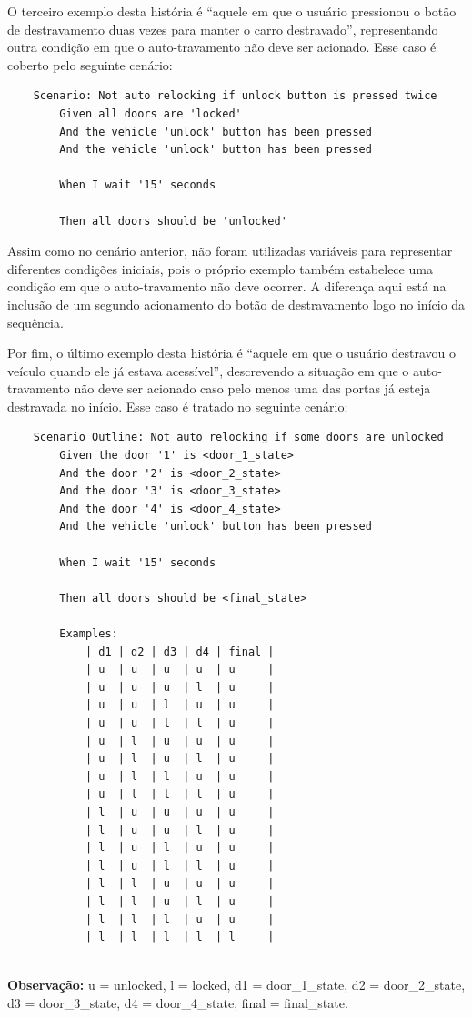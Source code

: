 O terceiro exemplo desta história é ``aquele em que o usuário pressionou o botão de destravamento duas vezes para manter o carro destravado'', representando 
outra condição em que o auto-travamento não deve ser acionado. Esse caso é coberto pelo seguinte cenário:

\begin{verbatim}
    Scenario: Not auto relocking if unlock button is pressed twice
        Given all doors are 'locked'
        And the vehicle 'unlock' button has been pressed
        And the vehicle 'unlock' button has been pressed

        When I wait '15' seconds

        Then all doors should be 'unlocked'
\end{verbatim}

Assim como no cenário anterior, não foram utilizadas variáveis para representar diferentes condições iniciais, pois o próprio exemplo também estabelece uma condição 
em que o auto-travamento não deve ocorrer. A diferença aqui está na inclusão de um segundo acionamento do botão de destravamento logo no início da sequência.

Por fim, o último exemplo desta história é ``aquele em que o usuário destravou o veículo quando ele já estava acessível'', descrevendo a situação em que o auto-travamento 
não deve ser acionado caso pelo menos uma das portas já esteja destravada no início. Esse caso é tratado no seguinte cenário:

\begin{verbatim}
    Scenario Outline: Not auto relocking if some doors are unlocked
        Given the door '1' is <door_1_state>
        And the door '2' is <door_2_state>
        And the door '3' is <door_3_state>
        And the door '4' is <door_4_state>
        And the vehicle 'unlock' button has been pressed
        
        When I wait '15' seconds
        
        Then all doors should be <final_state>
        
        Examples:
            | d1 | d2 | d3 | d4 | final |
            | u  | u  | u  | u  | u     |
            | u  | u  | u  | l  | u     |
            | u  | u  | l  | u  | u     |
            | u  | u  | l  | l  | u     |
            | u  | l  | u  | u  | u     |
            | u  | l  | u  | l  | u     |
            | u  | l  | l  | u  | u     |
            | u  | l  | l  | l  | u     |
            | l  | u  | u  | u  | u     |
            | l  | u  | u  | l  | u     |
            | l  | u  | l  | u  | u     |
            | l  | u  | l  | l  | u     |
            | l  | l  | u  | u  | u     |
            | l  | l  | u  | l  | u     |
            | l  | l  | l  | u  | u     |
            | l  | l  | l  | l  | l     |
    
\end{verbatim}
\noindent\textbf{Observação:} u = unlocked, l = locked, d1 = door\_1\_state, d2 = door\_2\_state, d3 = door\_3\_state, d4 = door\_4\_state, final = final\_state.

